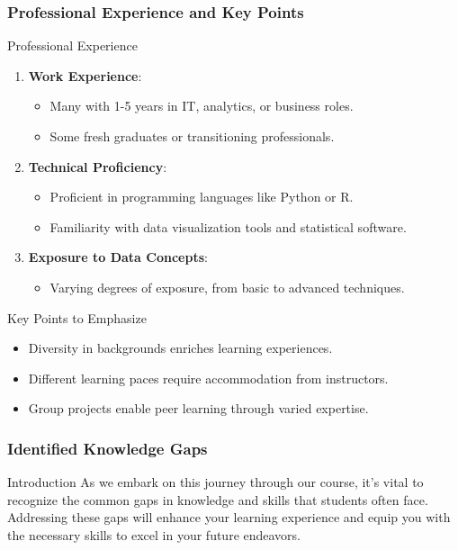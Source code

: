 \documentclass[aspectratio=169]{beamer}
\begin{document}
\begin{frame}[fragile]
    \frametitle{Professional Experience and Key Points}
    \begin{block}{Professional Experience}
        \begin{enumerate}
            \item \textbf{Work Experience}:
            \begin{itemize}
                \item Many with 1-5 years in IT, analytics, or business roles.
                \item Some fresh graduates or transitioning professionals.
            \end{itemize}

            \item \textbf{Technical Proficiency}:
            \begin{itemize}
                \item Proficient in programming languages like Python or R.
                \item Familiarity with data visualization tools and statistical software.
            \end{itemize}

            \item \textbf{Exposure to Data Concepts}:
            \begin{itemize}
                \item Varying degrees of exposure, from basic to advanced techniques.
            \end{itemize}
        \end{enumerate}
    \end{block}

    \begin{block}{Key Points to Emphasize}
        \begin{itemize}
            \item Diversity in backgrounds enriches learning experiences.
            \item Different learning paces require accommodation from instructors.
            \item Group projects enable peer learning through varied expertise.
        \end{itemize}
    \end{block}
\end{frame}

\begin{frame}[fragile]
    \frametitle{Identified Knowledge Gaps}
    \begin{block}{Introduction}
        As we embark on this journey through our course, it’s vital to recognize the common gaps in knowledge and skills that students often face. Addressing these gaps will enhance your learning experience and equip you with the necessary skills to excel in your future endeavors.
    \end{block}
\end{frame}
\end{document}

